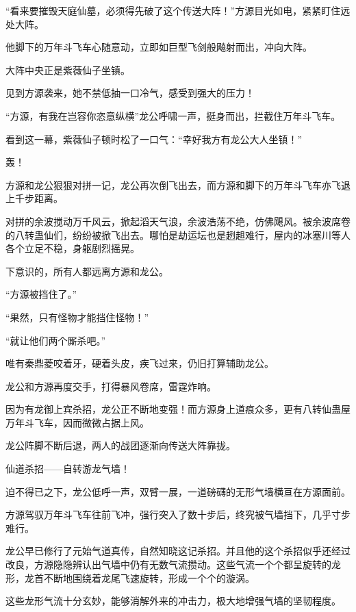 
\begin{this_body}



“看来要摧毁天庭仙墓，必须得先破了这个传送大阵！”方源目光如电，紧紧盯住远处大阵。

他脚下的万年斗飞车心随意动，立即如巨型飞剑般飚射而出，冲向大阵。

大阵中央正是紫薇仙子坐镇。

见到方源袭来，她不禁低抽一口冷气，感受到强大的压力！

“方源，有我在岂容你恣意纵横”龙公呼啸一声，挺身而出，拦截住万年斗飞车。

看到这一幕，紫薇仙子顿时松了一口气：“幸好我方有龙公大人坐镇！”

轰！

方源和龙公狠狠对拼一记，龙公再次倒飞出去，而方源和脚下的万年斗飞车亦飞退上千步距离。

对拼的余波搅动万千风云，掀起滔天气浪，余波浩荡不绝，仿佛飓风。被余波席卷的八转蛊仙们，纷纷被掀飞出去。哪怕是劫运坛也是趔趄难行，屋内的冰塞川等人各个立足不稳，身躯剧烈摇晃。

下意识的，所有人都远离方源和龙公。

“方源被挡住了。”

“果然，只有怪物才能挡住怪物！”

“就让他们两个厮杀吧。”

唯有秦鼎菱咬着牙，硬着头皮，疾飞过来，仍旧打算辅助龙公。

龙公和方源再度交手，打得暴风卷席，雷霆炸响。

因为有龙御上宾杀招，龙公正不断地变强！而方源身上道痕众多，更有八转仙蛊屋万年斗飞车，因而微微占据上风。

龙公阵脚不断后退，两人的战团逐渐向传送大阵靠拢。

仙道杀招——自转游龙气墙！

迫不得已之下，龙公低呼一声，双臂一展，一道磅礴的无形气墙横亘在方源面前。

方源驾驭万年斗飞车往前飞冲，强行突入了数十步后，终究被气墙挡下，几乎寸步难行。

龙公早已修行了元始气道真传，自然知晓这记杀招。并且他的这个杀招似乎还经过改良，方源隐隐辨认出气墙中仍有无数气流攒动。这些气流一个个都呈旋转的龙形，龙首不断地围绕着龙尾飞速旋转，形成一个个的漩涡。

这些龙形气流十分玄妙，能够消解外来的冲击力，极大地增强气墙的坚韧程度。


\end{this_body}
